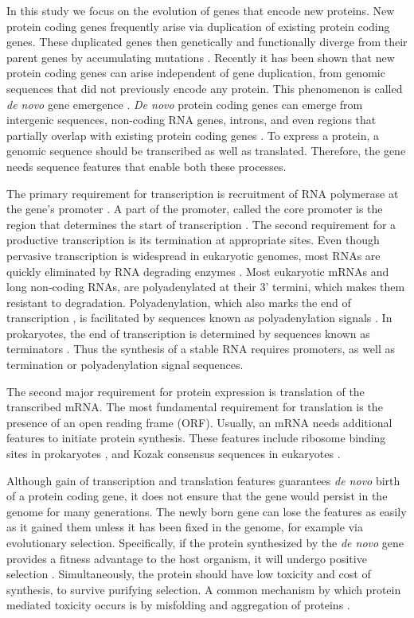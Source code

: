 \documentclass[12pt,a4paper]{article}
\begin{document}
In this study we focus on the evolution of genes that encode new proteins. New protein coding genes frequently arise via duplication of existing protein coding genes. These duplicated genes then genetically and functionally diverge from their parent genes by accumulating mutations \citep{Long2003,IAD}. Recently it has been shown that new protein coding genes can arise independent of gene duplication, from genomic sequences that did not previously encode any protein. This phenomenon is called \textit{de novo} gene emergence \citep{EBB-F1000,vanOss}. \textit{De novo} protein coding genes can emerge from intergenic sequences, non-coding RNA genes, introns, and even regions that partially overlap with existing protein coding genes \citep{vanOss}. To express a protein, a genomic sequence should be transcribed as well as translated. Therefore, the gene needs sequence features that enable both these processes. 

The primary requirement for transcription is recruitment of RNA polymerase at the gene's promoter \citep{Promoters}. A part of the promoter, called the core promoter is the region that determines the start of transcription \citep{corepromoters}. The second requirement for a productive transcription is its termination at appropriate sites. Even though pervasive transcription is widespread in eukaryotic genomes, most RNAs are quickly eliminated by RNA degrading enzymes \citep{RNAturnover}. Most eukaryotic mRNAs and long non-coding RNAs, are polyadenylated at their 3' termini, which makes them resistant to degradation. Polyadenylation, which also marks the end of transcription \citep{polyAterm}, is facilitated by sequences known as polyadenylation signals \cite{polyA}. In prokaryotes, the end of transcription is determined by sequences known as terminators \citep{ProkTerm}. Thus the synthesis of a stable RNA requires promoters, as well as termination or polyadenylation signal sequences.

The second major requirement for protein expression is translation of the transcribed mRNA. The most fundamental requirement for translation is the presence of an open reading frame (ORF). Usually, an mRNA needs additional features to initiate protein synthesis. These features include ribosome binding sites in prokaryotes \citep{RBS}, and Kozak consensus sequences in eukaryotes \citep{kozak,kozakDroso,kozakHuman}. 

Although gain of transcription and translation features guarantees \textit{de novo} birth of a protein coding gene, it does not ensure that the gene would persist in the genome for many generations. The newly born gene can lose the features as easily as it gained them unless it has been fixed in the genome, for example via evolutionary selection. Specifically, if the protein synthesized by the \textit{de novo} gene provides a fitness advantage to the host organism, it will undergo positive selection \citep{deNovoFunction}. Simultaneously, the protein should have low toxicity and cost of synthesis, to survive purifying selection. A common mechanism by which protein mediated toxicity occurs is by misfolding and aggregation of proteins \citep{misfold1,misfold2}.
\end{document}
